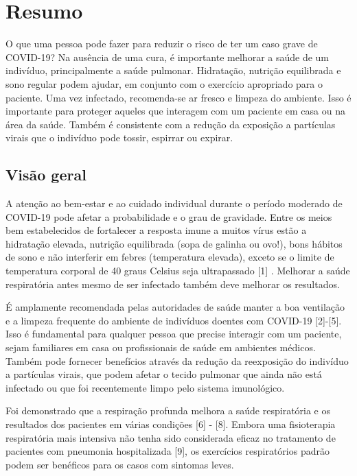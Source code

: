 \documentclass[onecolumn,journal]{IEEEtran}
\begin{document}
\section*{Resumo}

O que uma pessoa pode fazer para reduzir o risco de ter um caso grave de COVID-19? Na ausência de uma cura, é importante melhorar a saúde de um indivíduo, principalmente a saúde pulmonar. Hidratação, nutrição equilibrada e sono regular podem ajudar, em conjunto com o exercício apropriado para o paciente. Uma vez infectado, recomenda-se ar fresco e limpeza do ambiente. Isso é importante para proteger aqueles que interagem com um paciente em casa ou na área da saúde. Também é consistente com a redução da exposição a partículas virais que o indivíduo pode tossir, espirrar ou expirar.

\begin{multicols}{2}
\section*{Visão geral}

A atenção ao bem-estar e ao cuidado individual durante o período moderado de COVID-19 pode afetar a probabilidade e o grau de gravidade. Entre os meios bem estabelecidos de fortalecer a resposta imune a muitos vírus estão a hidratação elevada, nutrição equilibrada (sopa de galinha ou ovo!), bons hábitos de sono e não interferir em febres (temperatura elevada), exceto se o limite de temperatura corporal de 40 graus Celsius seja ultrapassado [1] . Melhorar a saúde respiratória antes mesmo de ser infectado também deve melhorar os resultados.

É amplamente recomendada pelas autoridades de saúde manter a boa ventilação e a limpeza frequente do ambiente de indivíduos doentes com COVID-19 [2]-[5]. Isso é fundamental para qualquer pessoa que precise interagir com um paciente, sejam familiares em casa ou profissionais de saúde em ambientes médicos. Também pode fornecer benefícios através da redução da reexposição do indivíduo a partículas virais, que podem afetar o tecido pulmonar que ainda não está infectado ou que foi recentemente limpo pelo sistema imunológico.

Foi demonstrado que a respiração profunda melhora a saúde respiratória e os resultados dos pacientes em várias condições [6] - [8]. Embora uma fisioterapia respiratória mais intensiva não tenha sido considerada eficaz no tratamento de pacientes com pneumonia hospitalizada [9], os exercícios respiratórios padrão podem ser benéficos para os casos com sintomas leves.


\end{multicols}
\end{document}
